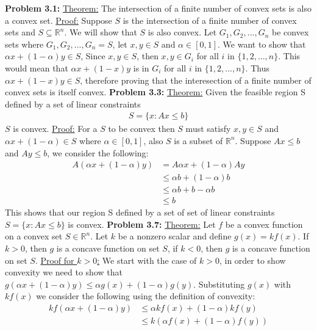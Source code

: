 \documentclass{article}
\begin{document}
\break \break
\textbf{Problem 3.1:} \underline{Theorem:} The intersection of a finite number of convex sets is also a convex set.
\newline \underline{Proof:} Suppose $S$ is the intersection of a finite number of convex sets and $S \subseteq \mathbb{R}^n$. We will show that $S$ is also convex. Let $G_1, G_2, ... , G_n$ be convex sets where $G_1, G_2, ... , G_n = S$, let $x, y \in S$ and $\alpha \in [0,1]$. We want to show that $\alpha x + (1-\alpha)y \in S$, Since $x,y \in S$, then $x,y \in G_i$ for all $i$ in $ \{1, 2, ..., n\} $. This would mean that $\alpha x + (1 - x)y$ is in $G_i$ for all $i$ in $\{1,2,...,n\}$. Thus $\alpha x + (1 - x)y \in S$, therefore proving that the interesection of a finite number of convex sets is itself convex.
\break
\break
\textbf{Problem 3.3:} \underline{Theorem:} Given the feasible region S defined by a set of linear constraints
\begin{align*}
    S = \{ x : Ax \leq b \}
\end{align*}
$S$ is convex.
\newline \underline{Proof:} For a $S$ to be convex then $S$ must satisfy $x,y \in S$ and $\alpha x + (1 - \alpha) \in S$ where $\alpha \in [0,1]$, also $S$ is a subset of $\mathbb{R}^n$.  Suppose $Ax \leq b$ and $Ay \leq b$, we consider the following:
\begin{align*}
    A(\alpha x + (1 - \alpha)y) & = A\alpha x + (1 - \alpha)Ay \\
    & \leq \alpha b + (1 - \alpha)b \\
    & \leq \alpha b + b - \alpha b \\
    & \leq b 
\end{align*}
This shows that our region S defined by a set of set of linear constraints $S = \{ x : Ax \leq b \}$ is convex.
\break
\break
\textbf{Problem 3.7:} \underline{Theorem:} Let $f$ be a convex function on a convex set $S \in \mathbb{R}^n$. Let $k$ be a nonzero scalar and define $g(x) = kf(x)$. If  $k > 0$, then $g$ is a concave function on set $S$, if $k < 0$, then $g$ is a concave function on set $S$.
\newline \underline{Proof for $k > 0$:} We start with the case of $k > 0$, in order to show convexity we need to show that $g(\alpha x + (1 - \alpha)y)  \leq \alpha g(x) + (1 - \alpha)g(y)$. Substituting $g(x)$ with $kf(x)$ we consider the following using the definition of convexity:
\begin{align*}
    kf(\alpha x + (1 - \alpha)y) & \leq \alpha kf(x) + (1 - \alpha)kf(y) \\ 
    & \leq k(\alpha f(x) + (1 - \alpha)f(y)) 
\end{align*}
\end{document}
